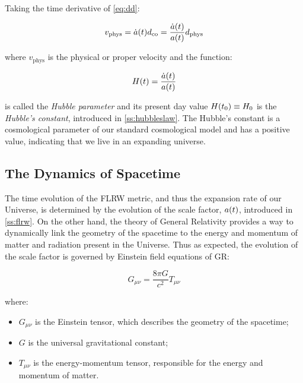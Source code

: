 Taking the time derivative of \autoref{eq:dd}:

\begin{equation}
        v_{\text{phys}} = \dot a\qty(t) d_{\text{co}} = \frac{\dot a\qty(t)}{a\qty(t)} d_{\text{phys}}
\end{equation}

where $v_{\text{phys}}$ is the physical or proper velocity and the function:

\begin{equation}
        H\qty(t) = \frac{\dot a\qty(t)}{a\qty(t)}
        \label{eq:hubble_parameter}
\end{equation}

is called the \emph{Hubble parameter} and its present day value $H\qty(t_0)
\equiv H_0$ is the \emph{Hubble's constant}, introduced in
\autoref{ss:hubbleslaw}. The Hubble's constant is a cosmological
parameter of our standard cosmological model and has a positive value,
indicating that we live in an expanding universe.

\subsection{The Dynamics of Spacetime}

The time evolution of the FLRW metric, and thus the expansion rate of our
Universe, is determined by the evolution of the scale factor, $a\qty(t)$,
introduced in \autoref{ss:flrw}. On the other hand, the theory of General
Relativity provides a way to dynamically link the geometry of the spacetime
to the energy and momentum of matter and radiation present in the Universe.
Thus as expected, the evolution of the scale factor is governed by Einstein
field equations of GR:

\begin{equation}
        G_{\mu \nu} = \frac{8 \pi G}{c^2} T_{\mu \nu}
        \label{eq:einstein}
\end{equation}

where:

\begin{itemize}
        \item $G_{\mu \nu}$ is the Einstein tensor, which describes the
        geometry of the spacetime;
        \item $G$ is the universal gravitational constant;
        \item $T_{\mu \nu}$ is the energy-momentum tensor, responsible for
        the energy and momentum of matter.
\end{itemize}

